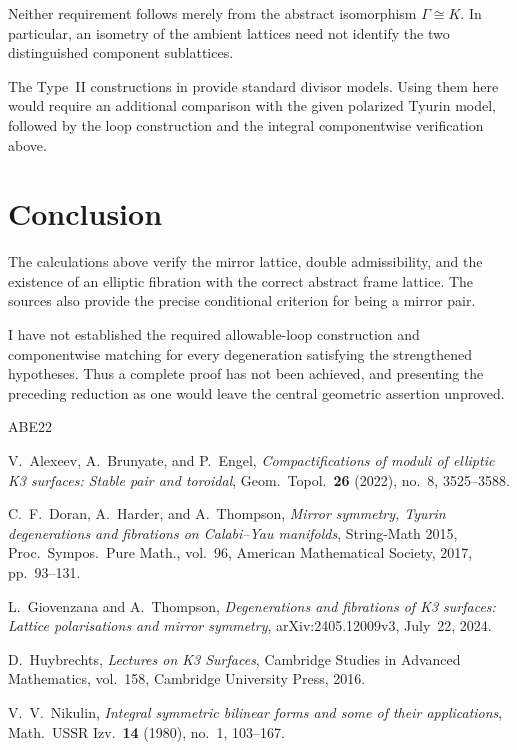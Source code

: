 \documentclass[11pt]{amsart}
\theoremstyle{remark}
\begin{document}
Neither requirement follows merely from the abstract isomorphism
\(\Gamma\cong K\).
In particular, an isometry of the ambient lattices need not identify
the two distinguished component sublattices.

The Type~II constructions in \cite[Section~7F]{ABE22} provide standard
divisor models.
Using them here would require an additional comparison with the
given polarized Tyurin model, followed by the loop construction and
the integral componentwise verification above.

\section*{Conclusion}

The calculations above verify the mirror lattice, double
admissibility, and the existence of an elliptic fibration with the
correct abstract frame lattice.  The sources also provide the precise
conditional criterion for being a mirror pair.

I have not established the required allowable-loop construction and
componentwise matching for every degeneration satisfying the
strengthened hypotheses.  Thus a complete proof has not been
achieved, and presenting the preceding reduction as one would leave
the central geometric assertion unproved.

\begin{thebibliography}{ABE22}

V.~Alexeev, A.~Brunyate, and P.~Engel,
\emph{Compactifications of moduli of elliptic K3 surfaces:
Stable pair and toroidal},
Geom.\ Topol.\ \textbf{26} (2022), no.~8, 3525--3588.

C.~F.~Doran, A.~Harder, and A.~Thompson,
\emph{Mirror symmetry, Tyurin degenerations and fibrations on
Calabi--Yau manifolds},
String-Math 2015, Proc.\ Sympos.\ Pure Math., vol.~96,
American Mathematical Society, 2017, pp.~93--131.

L.~Giovenzana and A.~Thompson,
\emph{Degenerations and fibrations of K3 surfaces:
Lattice polarisations and mirror symmetry},
arXiv:2405.12009v3, July~22, 2024.

D.~Huybrechts,
\emph{Lectures on K3 Surfaces},
Cambridge Studies in Advanced Mathematics, vol.~158,
Cambridge University Press, 2016.

V.~V.~Nikulin,
\emph{Integral symmetric bilinear forms and some of their applications},
Math.\ USSR Izv.\ \textbf{14} (1980), no.~1, 103--167.

\end{thebibliography}
\end{document}
